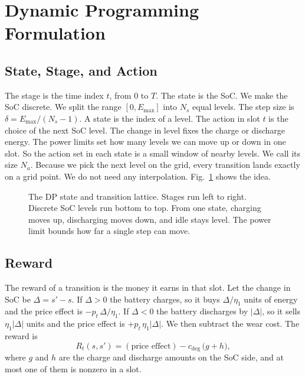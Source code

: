 \documentclass[conference,a4paper]{IEEEtran}
\begin{document}
\section{Dynamic Programming Formulation}\label{sec:dp}

\subsection{State, Stage, and Action}
The stage is the time index $t$, from $0$ to $T$. The state is the SoC. We
make the SoC discrete. We split the range $[0, E_{\max}]$ into $N_s$ equal
levels. The step size is $\delta = E_{\max}/(N_s-1)$. A state is the index of
a level. The action in slot $t$ is the choice of the next SoC level. The
change in level fixes the charge or discharge energy. The power limits set how
many levels we can move up or down in one slot. So the action set in each
state is a small window of nearby levels. We call its size $N_a$. Because we
pick the next level on the grid, every transition lands exactly on a grid
point. We do not need any interpolation. Fig.~\ref{fig:lattice} shows the
idea.

\begin{figure}[t]
\centering

\caption{The DP state and transition lattice. Stages run left to right.
Discrete SoC levels run bottom to top. From one state, charging moves up,
discharging moves down, and idle stays level. The power limit bounds how far a
single step can move.}
\label{fig:lattice}
\end{figure}

\subsection{Reward}
The reward of a transition is the money it earns in that slot. Let the change
in SoC be $\Delta = s' - s$. If $\Delta>0$ the battery charges, so it buys
$\Delta/\eta_1$ units of energy and the price effect is $-p_t\,\Delta/\eta_1$.
If $\Delta<0$ the battery discharges by $|\Delta|$, so it sells
$\eta_1|\Delta|$ units and the price effect is $+p_t\,\eta_1|\Delta|$. We then
subtract the wear cost. The reward is
\begin{equation}
R_t(s,s') = (\text{price effect}) - c_{\text{deg}}\,\big(g + h\big),
\end{equation}
where $g$ and $h$ are the charge and discharge amounts on the SoC side, and at
most one of them is nonzero in a slot.
\end{document}
